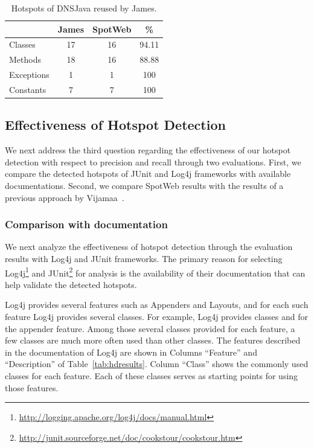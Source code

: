 \setlength{\tabcolsep}{1pt}
\begin{table}[t]
\begin{CodeOut}
\begin{center}
\begin {tabular} {|l|c|c|c|}
\hline
&James&SpotWeb&\%\\
\hline Classes&17&16&94.11\\
\hline Methods&18&16&88.88\\
\hline Exceptions&1&1&100\\
\hline Constants&7&7&100\\
\hline
\end{tabular}
\centering \caption {\label{tab:jamesres} Hotspots of DNSJava reused by James.}
\end{center}
\end{CodeOut}
\end{table}


\subsection{Effectiveness of Hotspot Detection}
We next address the third question regarding the effectiveness of our hotspot detection
with respect to precision and recall through two evaluations. First, we compare
the detected hotspots of JUnit and Log4j frameworks with available documentations.
Second, we compare SpotWeb results with the results of a previous approach 
by Vijamaa~\cite{viljamaa:reverse}.

\subsubsection{Comparison with documentation}
We next analyze the effectiveness of hotspot detection through the
evaluation results with Log4j and JUnit frameworks. The primary
reason for selecting Log4j\footnote{\url{http://logging.apache.org/log4j/docs/manual.html}}
and JUnit\footnote{\url{http://junit.sourceforge.net/doc/cookstour/cookstour.htm}}
for analysis is the availability of their documentation that can
help validate the detected hotspots. 

Log4j provides several features such as Appenders and Layouts, and
for each such feature Log4j provides several classes. For example, Log4j
provides classes  and  for the appender feature.
Among those several classes provided for each feature, a few classes are
much more often used than other classes. The features described in the documentation of Log4j are shown in
Columns ``Feature'' and ``Description'' of Table~\ref{tab:hdresults}. Column
``Class'' shows the commonly used classes for each feature. Each of these
classes serves as starting points for using those features.

